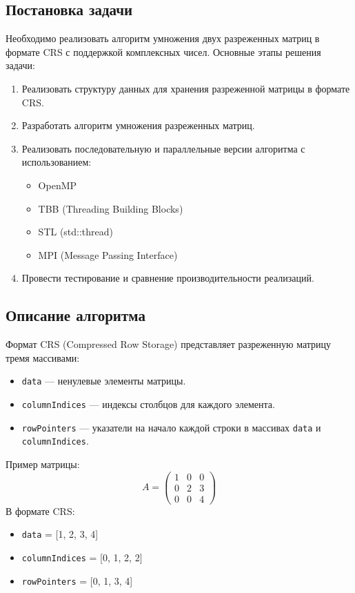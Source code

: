 \documentclass[12pt]{article}
\begin{document}
\newpage
\begin{center}
    \section*{Постановка задачи}
\end{center}
Необходимо реализовать алгоритм умножения двух разреженных матриц в формате CRS с поддержкой комплексных чисел. Основные этапы решения задачи:
\begin{enumerate}
    \item Реализовать структуру данных для хранения разреженной матрицы в формате CRS.
    \item Разработать алгоритм умножения разреженных матриц.
    \item Реализовать последовательную и параллельные версии алгоритма с использованием:
    \begin{itemize}
        \item OpenMP
        \item TBB (Threading Building Blocks)
        \item STL (std::thread)
        \item MPI (Message Passing Interface)
    \end{itemize}
    \item Провести тестирование и сравнение производительности реализаций.
\end{enumerate}

\newpage
\begin{center}
    \section*{Описание алгоритма}
\end{center}

Формат CRS (Compressed Row Storage) представляет разреженную матрицу тремя массивами:
\begin{itemize}
    \item \texttt{data} — ненулевые элементы матрицы.
    \item \texttt{columnIndices} — индексы столбцов для каждого элемента.
    \item \texttt{rowPointers} — указатели на начало каждой строки в массивах \texttt{data} и \texttt{columnIndices}.
\end{itemize}

Пример матрицы:
\[
A = \begin{pmatrix}
1 & 0 & 0 \\
0 & 2 & 3 \\
0 & 0 & 4
\end{pmatrix}
\]
В формате CRS:
\begin{itemize}
    \item \texttt{data} = [1, 2, 3, 4]
    \item \texttt{columnIndices} = [0, 1, 2, 2]
    \item \texttt{rowPointers} = [0, 1, 3, 4]
\end{itemize}
\end{document}
